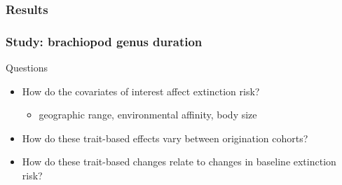 \documentclass{beamer}
\begin{document}
\begin{frame}
  \frametitle{Results}
\end{frame}


\begin{frame}
  \frametitle{Study: brachiopod genus duration}

  \begin{alertblock}{Questions}
    \begin{itemize}
      \item How do the covariates of interest affect extinction risk?
        \begin{itemize}
          \item geographic range, environmental affinity, body size 
        \end{itemize}
      \item How do these trait-based effects vary between origination cohorts?
      \item How do these trait-based changes relate to changes in baseline extinction risk?
    \end{itemize}
  \end{alertblock}
\end{frame}
\end{document}
